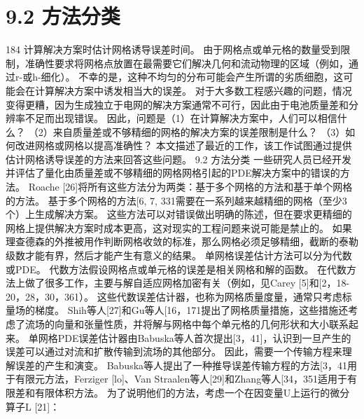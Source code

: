 \documentclass[UTF8,11pt,a4paper,openany,fontset=fandol]{ctexbook}
\begin{document}
\section{9.2 方法分类}
184 计算解决方案时估计网格诱导误差时间。 由于网格点或单元格的数量受到限制，准确性要求将网格点放置在最需要它们解决几何和流动物理的区域（例如，通过r-或h-细化）。 不幸的是，这种不均匀的分布可能会产生所谓的劣质细胞，这可能会在计算解决方案中诱发相当大的误差。 对于大多数工程感兴趣的问题，情况变得更糟，因为生成独立于电网的解决方案通常不可行，因此由于电池质量差和分辨率不足而出现错误。 因此，问题是（1）在计算解决方案中，人们可以相信什么？ （2）来自质量差或不够精细的网格的解决方案的误差限制是什么？ （3）如何改进网格或网格以提高准确性？ 本文描述了最近的工作，该工作试图通过提供估计网格诱导误差的方法来回答这些问题。 9.2 方法分类 一些研究人员已经开发并评估了量化由质量差或不够精细的网格网格引起的PDE解决方案中的错误的方法。 Roache [26]将所有这些方法分为两类：基于多个网格的方法和基于单个网格的方法。 基于多个网格的方法[6, 7, 331需要在一系列越来越精细的网格（至少3个）上生成解决方案。 这些方法可以对错误做出明确的陈述，但在要求更精细的网格上提供解决方案时成本更高，这对现实的工程问题来说可能是禁止的。 如果理查德森的外推被用作判断网格收敛的标准，那么网格必须足够精细，截断的泰勒级数才能有界，然后才能产生有意义的结果。 单网格误差估计方法可以分为代数或PDE。 代数方法假设网格点或单元格的误差是相关网格和解的函数。 在代数方法上做了很多工作，主要与解自适应网格加密有关（例如，见Carey [5]和[2，18-20，28，30，361）。 这些代数误差估计器，也称为网格质量度量，通常只考虑标量场的梯度。 Shih等人[27]和Gu等人[16，171提出了网格质量措施，这些措施还考虑了流场的向量和张量性质，并将解与网格中每个单元格的几何形状和大小联系起来。 单网格PDE误差估计器由Babuska等人首次提出[3，41]，认识到一旦产生的误差可以通过对流和扩散传输到流场的其他部分。 因此，需要一个传输方程来理解误差的产生和演变。 Babuska等人提出了一种推导误差传输方程的方法[3，41用于有限元方法，Ferziger [lo]、Van Straalen等人[29]和Zhang等人[34，351适用于有限差和有限体积方法。 为了说明他们的方法，考虑一个在因变量U上运行的微分算子L [21]：
\end{document}
